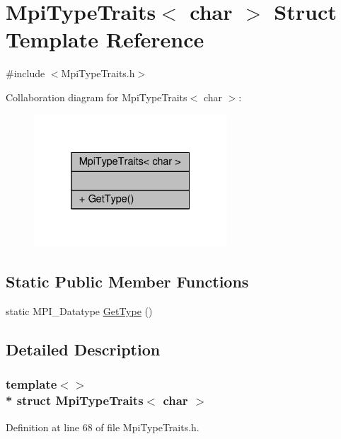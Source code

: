 \hypertarget{structMpiTypeTraits_3_01char_01_4}{}\section{Mpi\+Type\+Traits$<$ char $>$ Struct Template Reference}
\label{structMpiTypeTraits_3_01char_01_4}


{\ttfamily \#include $<$Mpi\+Type\+Traits.\+h$>$}



Collaboration diagram for Mpi\+Type\+Traits$<$ char $>$\+:
\nopagebreak
\begin{figure}[H]
\begin{center}
\leavevmode
\includegraphics[width=205pt]{structMpiTypeTraits_3_01char_01_4__coll__graph}
\end{center}
\end{figure}
\subsection*{Static Public Member Functions}
\begin{DoxyCompactItemize}
\item 
static M\+P\+I\+\_\+\+Datatype \hyperlink{structMpiTypeTraits_3_01char_01_4_a5d2395b018e7dab38855b5810a75e203}{Get\+Type} ()
\end{DoxyCompactItemize}


\subsection{Detailed Description}
\subsubsection*{template$<$$>$\\*
struct Mpi\+Type\+Traits$<$ char $>$}



Definition at line 68 of file Mpi\+Type\+Traits.\+h.



